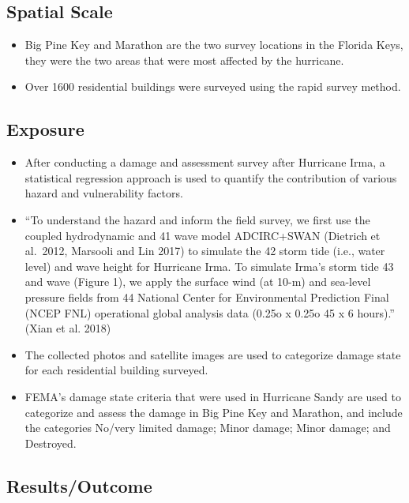 \documentclass[
]{article}
\providecommand{\tightlist}{%
  \setlength{\itemsep}{0pt}\setlength{\parskip}{0pt}}
\begin{document}
\hypertarget{spatial-scale-25}{%
\subsection{Spatial Scale}\label{spatial-scale-25}}

\begin{itemize}
\tightlist
\item
  Big Pine Key and Marathon are the two survey locations in the Florida
  Keys, they were the two areas that were most affected by the
  hurricane.
\item
  Over 1600 residential buildings were surveyed using the rapid survey
  method.
\end{itemize}

\hypertarget{exposure-24}{%
\subsection{Exposure}\label{exposure-24}}

\begin{itemize}
\tightlist
\item
  After conducting a damage and assessment survey after Hurricane Irma,
  a statistical regression approach is used to quantify the contribution
  of various hazard and vulnerability factors.
\item
  ``To understand the hazard and inform the field survey, we first use
  the coupled hydrodynamic and 41 wave model ADCIRC+SWAN (Dietrich et
  al.~2012, Marsooli and Lin 2017) to simulate the 42 storm tide (i.e.,
  water level) and wave height for Hurricane Irma. To simulate Irma's
  storm tide 43 and wave (Figure 1), we apply the surface wind (at 10-m)
  and sea-level pressure fields from 44 National Center for
  Environmental Prediction Final (NCEP FNL) operational global analysis
  data (0.25o x 0.25o 45 x 6 hours).'' (Xian et al. 2018)
\item
  The collected photos and satellite images are used to categorize
  damage state for each residential building surveyed.
\item
  FEMA's damage state criteria that were used in Hurricane Sandy are
  used to categorize and assess the damage in Big Pine Key and Marathon,
  and include the categories No/very limited damage; Minor damage; Minor
  damage; and Destroyed.
\end{itemize}

\hypertarget{resultsoutcome-6}{%
\subsection{Results/Outcome}\label{resultsoutcome-6}}
\end{document}
